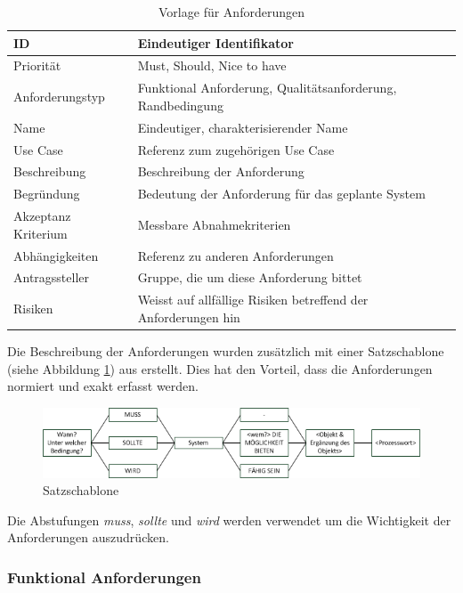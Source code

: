 \begin{table}[ht]
\centering
  \begin{tabular}{ l | p{8cm} }
	\hline
	\rowcolor{gray}
	ID 			&	Eindeutiger Identifikator\\ \hline
	Priorität 		&	Must, Should, Nice to have\\ \hline
	Anforderungstyp	&	Funktional Anforderung, Qualitätsanforderung, Randbedingung\\ \hline
	Name 			&	Eindeutiger, charakterisierender Name\\ \hline
	Use Case 		&	Referenz zum zugehörigen Use Case\\ \hline
	Beschreibung 	&	Beschreibung der Anforderung\\ \hline
	Begründung 		&	Bedeutung der Anforderung für das geplante System\\ \hline
	Akzeptanz Kriterium	&	Messbare Abnahmekriterien\\ \hline
	Abhängigkeiten 	&	Referenz zu anderen Anforderungen\\ \hline
	Antragssteller 	&	\glossarmark{Stakeholder} Gruppe, die um diese Anforderung bittet\\ \hline
	Risiken	 	&	Weisst auf allfällige Risiken betreffend der Anforderungen hin
  \end{tabular}
   \caption{Vorlage für Anforderungen}\label{table:req_template}
\end{table}


Die Beschreibung der Anforderungen wurden zusätzlich mit einer Satzschablone (siehe Abbildung \ref{fig:satzschablone}) aus \cite{req_eng_book} erstellt. Dies hat den Vorteil, dass die Anforderungen normiert und exakt erfasst werden.
\begin{figure}[h]
\includegraphics{images/anforderungen/satzschablone.png}
\caption{Satzschablone}
\label{fig:satzschablone}
\end{figure}
\FloatBarrier
Die Abstufungen \emph{muss}, \emph{sollte} und \emph{wird} werden verwendet um die Wichtigkeit der Anforderungen auszudrücken.

\newpage
\FloatBarrier
\subsubsection{Funktional Anforderungen}\label{func_anforderungen}

